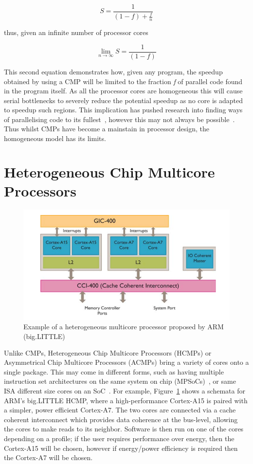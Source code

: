 \begin{equation}
S = \frac{1}{(1-f) + \frac{f}{n}}
\end{equation}\label{amdlaw}

thus, given an infinite number of processor cores~\cite{ekhout2010amdalh}

\begin{equation}
\lim_{n\to\infty} S = \frac{1}{(1-f)}
\end{equation}

This second equation demonstrates how, given any program, the speedup obtained by using a CMP will be limited to the fraction \textit{f} of parallel code found in the program itself.
As all the processor cores are homogeneous this will cause serial bottlenecks to severely reduce the potential speedup as no core is adapted to speedup such regions.
This implication has pushed research into finding ways of parallelising code to its fullest~\cite{}, however this may not always be possible~\cite{}.
Thus whilst CMPs have become a mainstain in processor design, the homogeneous model has its limits.

\section{Heterogeneous Chip Multicore Processors}

\begin{figure}[t]
 \center
 \includegraphics[width=1\textwidth]{background/graphics/biglittle.png}
 \caption{Example of a heterogeneous multicore processor proposed by ARM (big.LITTLE)}\label{fig:blarm}
\end{figure}

Unlike CMPs, Heterogeneous Chip Multicore Processors (HCMPs) or Asymmetrical Chip Multicore Processors (ACMPs) bring a variety of cores onto a single package.
This may come in different forms, such as having multiple instruction set architectures on the same system on chip (MPSoCs)~\cite{venkatharnessingISA,hipstr}, or same ISA different size cores on an SoC~\cite{bigLittle}.
For example, Figure~\ref{fig:blarm} shows a schemata for ARM's big.LITTLE HCMP, where a high-performance Cortex-A15 is paired with a simpler, power efficient Cortex-A7.
The two cores are connected via a cache coherent interconnect which provides data coherence at the bus-level, allowing the cores to make reads to its neighbor.
Software is then run on one of the cores depending on a profile; if the user requires performance over energy, then the Cortex-A15 will be chosen, however if energy/power efficiency is required then the Cortex-A7 will be chosen.

